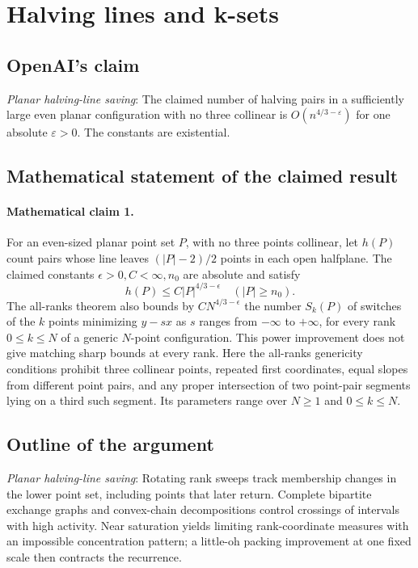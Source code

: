 \documentclass[11pt]{article}
\begin{document}
\section*{Halving lines and k-sets}

\subsection{OpenAI's claim}
\textit{Planar halving-line saving}: The claimed number of halving pairs in a sufficiently large even planar configuration with no three collinear is $O(n^{4/3-\varepsilon})$ for one absolute $\varepsilon>0$. The constants are existential.

\subsection{Mathematical statement of the claimed result}
\paragraph{Mathematical claim 1.} For an even-sized planar point set $P$, with no three points collinear, let $h(P)$ count pairs whose line leaves $(|P|-2)/2$ points in each open halfplane. The claimed constants $\epsilon>0,C<\infty,n_0$ are absolute and satisfy \[h(P)\le C|P|^{4/3-\epsilon}\quad(|P|\ge n_0).\] The all-ranks theorem also bounds by $CN^{4/3-\epsilon}$ the number $S_k(P)$ of switches of the $k$ points minimizing $y-sx$ as $s$ ranges from $-\infty$ to $+\infty$, for every rank $0\le k\le N$ of a generic $N$-point configuration. This power improvement does not give matching sharp bounds at every rank. Here the all-ranks genericity conditions prohibit three collinear points, repeated first coordinates, equal slopes from different point pairs, and any proper intersection of two point-pair segments lying on a third such segment. Its parameters range over $N\ge1$ and $0\le k\le N$.

\subsection{Outline of the argument}
\textit{Planar halving-line saving}: Rotating rank sweeps track membership changes in the lower point set, including points that later return. Complete bipartite exchange graphs and convex-chain decompositions control crossings of intervals with high activity. Near saturation yields limiting rank-coordinate measures with an impossible concentration pattern; a little-oh packing improvement at one fixed scale then contracts the recurrence.
\end{document}
